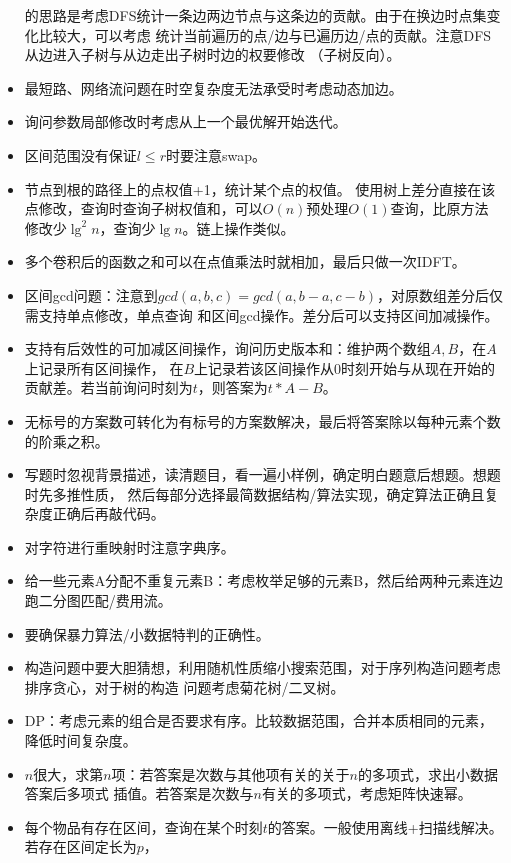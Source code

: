 \begin{itemize}
	      的思路是考虑DFS统计一条边两边节点与这条边的贡献。由于在换边时点集变化比较大，可以考虑
	      统计当前遍历的点/边与已遍历边/点的贡献。注意DFS从边进入子树与从边走出子树时边的权要修改
	      （子树反向）。
	\item 最短路、网络流问题在时空复杂度无法承受时考虑动态加边。
	\item 询问参数局部修改时考虑从上一个最优解开始迭代。
	\item 区间范围没有保证$l\leq r$时要注意swap。
	\item 节点到根的路径上的点权值+1，统计某个点的权值。
	使用树上差分直接在该点修改，查询时查询子树权值和，可以$O(n)$预处理$O(1)$查询，比原方法
	修改少$\lg^2 n$，查询少$\lg n$。链上操作类似。
	\item 多个卷积后的函数之和可以在点值乘法时就相加，最后只做一次IDFT。
	\item 区间gcd问题：注意到$gcd(a,b,c)=gcd(a,b-a,c-b)$，对原数组差分后仅需支持单点修改，单点查询
	和区间gcd操作。差分后可以支持区间加减操作。
	\item 支持有后效性的可加减区间操作，询问历史版本和：维护两个数组$A,B$，在$A$上记录所有区间操作，
	在$B$上记录若该区间操作从0时刻开始与从现在开始的贡献差。若当前询问时刻为$t$，则答案为$t*A-B$。
	\label{HistorySum}
	\item 无标号的方案数可转化为有标号的方案数解决，最后将答案除以每种元素个数的阶乘之积。
	\item 写题时忽视背景描述，读清题目，看一遍小样例，确定明白题意后想题。想题时先多推性质，
	然后每部分选择最简数据结构/算法实现，确定算法正确且复杂度正确后再敲代码。
	\item 对字符进行重映射时注意字典序。
	\item 给一些元素A分配不重复元素B：考虑枚举足够的元素B，然后给两种元素连边跑二分图匹配/费用流。
	\item 要确保暴力算法/小数据特判的正确性。
	\item 构造问题中要大胆猜想，利用随机性质缩小搜索范围，对于序列构造问题考虑排序贪心，对于树的构造
	问题考虑菊花树/二叉树。
	\item DP：考虑元素的组合是否要求有序。比较数据范围，合并本质相同的元素，降低时间复杂度。
	\item $n$很大，求第$n$项：若答案是次数与其他项有关的关于$n$的多项式，求出小数据答案后多项式
	插值。若答案是次数与$n$有关的多项式，考虑矩阵快速幂。
	\item 每个物品有存在区间，查询在某个时刻$t$的答案。一般使用离线+扫描线解决。若存在区间定长为$p$，

\end{itemize}
